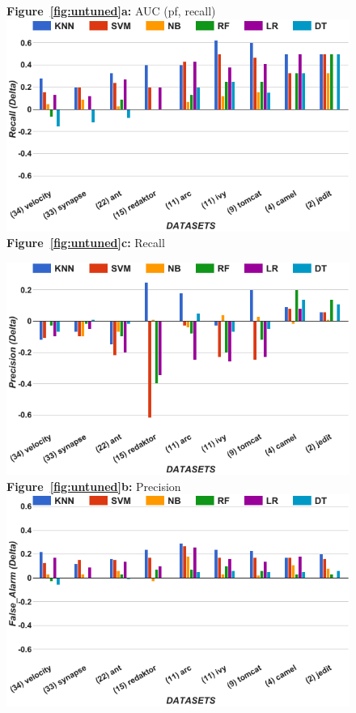 \begin{figure}[!t]
\begin{minipage}{.5\linewidth}
  {\bf Figure~\ref{fig:untuned}a:} AUC (pf, recall)
        \includegraphics[width=.95\linewidth]{./fig/Recall_untuned.png}
  {\bf Figure~\ref{fig:untuned}c:} Recall
    \end{minipage}%
\begin{minipage}{.5\linewidth}
        \centering
        \includegraphics[width=.95\linewidth]{./fig/prec_untuned.png}
  {\bf Figure~\ref{fig:untuned}b:} Precision
        \includegraphics[width=.95\linewidth]{./fig/pf_untuned.png}

\end{minipage}
\end{figure}
